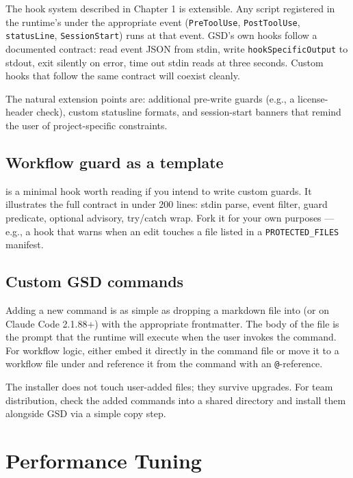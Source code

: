 \documentclass[11pt,letterpaper,openany]{book}
\begin{document}
The hook system described in Chapter 1 is extensible. Any script registered in the runtime's  under the appropriate event (\texttt{PreToolUse}, \texttt{PostToolUse}, \texttt{statusLine}, \texttt{SessionStart}) runs at that event. GSD's own hooks follow a documented contract: read event JSON from stdin, write \texttt{hookSpecificOutput} to stdout, exit silently on error, time out stdin reads at three seconds. Custom hooks that follow the same contract will coexist cleanly.

The natural extension points are: additional pre-write guards (e.g., a license-header check), custom statusline formats, and session-start banners that remind the user of project-specific constraints.

\section{Workflow guard as a template}

 is a minimal hook worth reading if you intend to write custom guards. It illustrates the full contract in under 200 lines: stdin parse, event filter, guard predicate, optional advisory, try/catch wrap. Fork it for your own purposes — e.g., a hook that warns when an edit touches a file listed in a \texttt{PROTECTED\_FILES} manifest.

\section{Custom GSD commands}

Adding a new \gsdcmd{*} command is as simple as dropping a markdown file into  (or  on Claude Code 2.1.88+) with the appropriate frontmatter. The body of the file is the prompt that the runtime will execute when the user invokes the command. For workflow logic, either embed it directly in the command file or move it to a workflow file under  and reference it from the command with an \texttt{@}-reference.

The installer does not touch user-added files; they survive upgrades. For team distribution, check the added commands into a shared directory and install them alongside GSD via a simple copy step.

\chapter{Performance Tuning}
\end{document}
